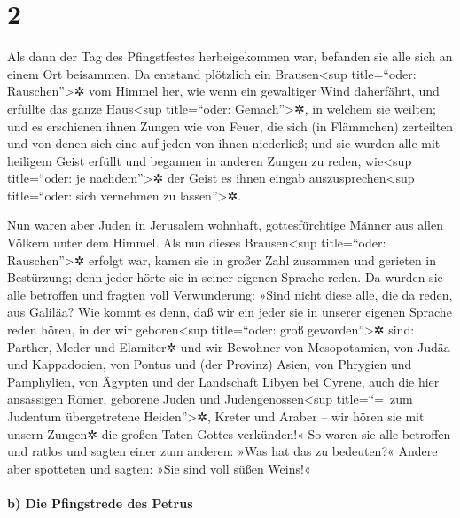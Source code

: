 \hypertarget{section-1}{%
\section{2}\label{section-1}}

 Als dann der Tag des Pfingstfestes herbeigekommen war,
befanden sie alle sich an einem Ort beisammen.  Da
entstand plötzlich ein Brausen\textless sup title=``oder:
Rauschen''\textgreater✲ vom Himmel her, wie wenn ein gewaltiger Wind
daherfährt, und erfüllte das ganze Haus\textless sup title=``oder:
Gemach''\textgreater✲, in welchem sie weilten;  und es
erschienen ihnen Zungen wie von Feuer, die sich (in Flämmchen)
zerteilten und von denen sich eine auf jeden von ihnen niederließ;
 und sie wurden alle mit heiligem Geist erfüllt und
begannen in anderen Zungen zu reden, wie\textless sup title=``oder: je
nachdem''\textgreater✲ der Geist es ihnen eingab
auszusprechen\textless sup title=``oder: sich vernehmen zu
lassen''\textgreater✲.

 Nun waren aber Juden in Jerusalem wohnhaft,
gottesfürchtige Männer aus allen Völkern unter dem Himmel.
 Als nun dieses Brausen\textless sup title=``oder:
Rauschen''\textgreater✲ erfolgt war, kamen sie in großer Zahl zusammen
und gerieten in Bestürzung; denn jeder hörte sie in seiner eigenen
Sprache reden.  Da wurden sie alle betroffen und fragten
voll Verwunderung: »Sind nicht diese alle, die da reden, aus Galiläa?
 Wie kommt es denn, daß wir ein jeder sie in unserer
eigenen Sprache reden hören, in der wir geboren\textless sup
title=``oder: groß geworden''\textgreater✲ sind:  Parther,
Meder und Elamiter✲ und wir Bewohner von Mesopotamien, von Judäa und
Kappadocien, von Pontus und (der Provinz) Asien,  von
Phrygien und Pamphylien, von Ägypten und der Landschaft Libyen bei
Cyrene, auch die hier ansässigen Römer,  geborene Juden
und Judengenossen\textless sup title=``=~zum Judentum übergetretene
Heiden''\textgreater✲, Kreter und Araber -- wir hören sie mit unsern
Zungen✲ die großen Taten Gottes verkünden!«  So waren sie
alle betroffen und ratlos und sagten einer zum anderen: »Was hat das zu
bedeuten?«  Andere aber spotteten und sagten: »Sie sind
voll süßen Weins!«

\hypertarget{b-die-pfingstrede-des-petrus}{%
\paragraph{b) Die Pfingstrede des
Petrus}\label{b-die-pfingstrede-des-petrus}}

